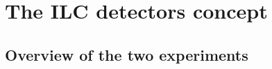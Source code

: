 

  \section{The ILC detectors concept}
  \label{sec:detectors}

    \subsection{Overview of the two experiments}
    
